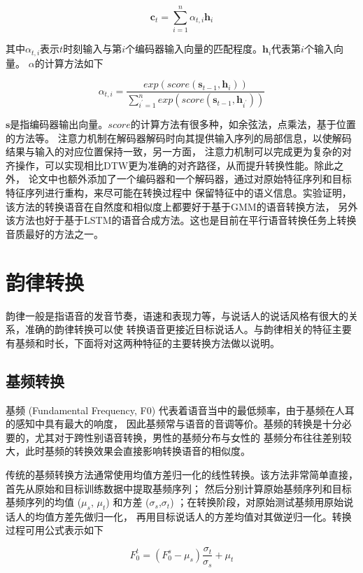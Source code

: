 \begin{equation}
    \mathbf{c}_t = \sum^n_{i=1}\alpha_{t, i}\mathbf{h}_i
\end{equation}

其中$\alpha_{t, i}$表示$t$时刻输入与第$i$个编码器输入向量的匹配程度。$\mathbf{h}_i$代表第$i$个输入向量。
$\alpha$的计算方法如下

\begin{equation}
    \alpha_{t, i} = \frac{exp(score(\mathbf{s}_{t-1},\mathbf{h}_i))}{\sum^{n}_{i^{'}=1}exp(score(\mathbf{s}_{t-1},\mathbf{h}_{i^{'}}))}
\end{equation}

$\mathbf{s}$是指编码器输出向量。$score$的计算方法有很多种，如余弦法，点乘法，基于位置的方法等。
注意力机制在解码器解码时向其提供输入序列的局部信息，以使解码结果与输入的对应位置保持一致，另一方面，
注意力机制可以完成更为复杂的对齐操作，可以实现相比DTW更为准确的对齐路径，从而提升转换性能。除此之外，
论文中也额外添加了一个编码器和一个解码器，通过对原始特征序列和目标特征序列进行重构，来尽可能在转换过程中
保留特征中的语义信息。实验证明，该方法的转换语音在自然度和相似度上都要好于基于GMM的语音转换方法，
另外该方法也好于基于LSTM的语音合成方法。这也是目前在平行语音转换任务上转换音质最好的方法之一。

\section{韵律转换}
韵律一般是指语音的发音节奏，语速和表现力等，与说话人的说话风格有很大的关系，准确的韵律转换可以使
转换语音更接近目标说话人。与韵律相关的特征主要有基频和时长，下面将对这两种特征的主要转换方法做以说明。

\subsection{基频转换}
基频 (Fundamental Frequency, F0) 代表着语音当中的最低频率，由于基频在人耳的感知中具有最大的响度，
因此基频常与语音的音调等价。基频的转换是十分必要的，尤其对于跨性别语音转换，男性的基频分布与女性的
基频分布往往差别较大，此时基频的转换效果会直接影响转换语音的相似度。

传统的基频转换方法通常使用均值方差归一化的线性转换。该方法非常简单直接，首先从原始和目标训练数据中提取基频序列；
然后分别计算原始基频序列和目标基频序列的均值 ($\mu_s$, $\mu_t$) 和方差 ($\sigma_s$,$\sigma_t$) ；在转换阶段，对原始测试基频用原始说话人的均值方差先做归一化，
再用目标说话人的方差均值对其做逆归一化。转换过程可用公式表示如下

\begin{equation}
    F_0^t = (F_0^s - \mu_s)\frac{\sigma_t}{\sigma_s} + \mu_t
\end{equation}

